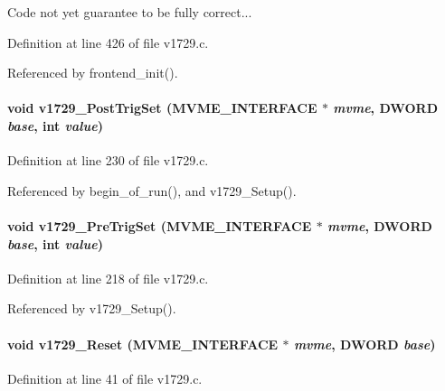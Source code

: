 Code not yet guarantee to be fully correct... 

Definition at line 426 of file v1729.c.

Referenced by frontend\_\-init().
\paragraph[{v1729\_\-PostTrigSet}]{\setlength{\rightskip}{0pt plus 5cm}void v1729\_\-PostTrigSet ({\bf MVME\_\-INTERFACE} $\ast$ {\em mvme}, \/  {\bf DWORD} {\em base}, \/  int {\em value})}\hfill\label{v1729_8h_a0c3ea27e8238bd1aa89966c08339681d}


Definition at line 230 of file v1729.c.

Referenced by begin\_\-of\_\-run(), and v1729\_\-Setup().
\paragraph[{v1729\_\-PreTrigSet}]{\setlength{\rightskip}{0pt plus 5cm}void v1729\_\-PreTrigSet ({\bf MVME\_\-INTERFACE} $\ast$ {\em mvme}, \/  {\bf DWORD} {\em base}, \/  int {\em value})}\hfill\label{v1729_8h_af7563525303a4654bb4f9eb0c7dc848c}


Definition at line 218 of file v1729.c.

Referenced by v1729\_\-Setup().
\paragraph[{v1729\_\-Reset}]{\setlength{\rightskip}{0pt plus 5cm}void v1729\_\-Reset ({\bf MVME\_\-INTERFACE} $\ast$ {\em mvme}, \/  {\bf DWORD} {\em base})}\hfill\label{v1729_8h_af17d36967203a1ea686bec0b86f149e7}


Definition at line 41 of file v1729.c.
